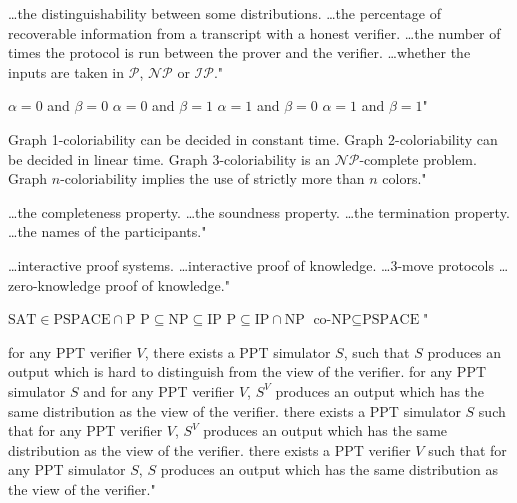{\ldots the distinguishability between some distributions.}
{\ldots the percentage of recoverable information from a transcript with a honest verifier.}
{\ldots the number of times the protocol is run between the prover and the verifier.}
{\ldots whether the inputs are taken in $\mathcal{P}$, $\mathcal{NP}$ or $\mathcal{IP}$."}

{$\alpha=0$ and $\beta=0$}
{$\alpha=0$ and $\beta=1$}
{$\alpha=1$ and $\beta=0$}
{$\alpha=1$ and $\beta=1$"}

{Graph 1-coloriability can be decided in constant time.}
{Graph 2-coloriability can be decided in linear time.}
{Graph 3-coloriability is an $\mathcal{NP}$-complete problem.}
{Graph $n$-coloriability implies the use of strictly more than $n$ colors."}

{\ldots the completeness property.}
{\ldots the soundness property.}
{\ldots the termination property.}
{\ldots the names of the participants."}

{\ldots interactive proof systems.}
{\ldots interactive proof of knowledge.}
{\ldots 3-move protocols}
{\ldots zero-knowledge proof of knowledge."}

{$\textrm{SAT} \in \textrm{PSPACE} \cap \textrm{P}$}
{$\textrm{P} \subseteq \textrm{NP} \subseteq \textrm{IP}$}
{$\textrm{P} \subseteq \textrm{IP} \cap \textrm{NP}$}
{$\textrm{co-NP} \subseteq \textrm{PSPACE}$"}

{for any PPT verifier $V$, there exists a PPT simulator $S$, such that $S$ produces an output which is hard to distinguish from the view of the verifier.}
{for any PPT simulator $S$ and for any PPT verifier $V$, $S^{V}$ produces an output which has the same distribution as the view of the verifier.}
{there exists a PPT simulator $S$ such that for any PPT verifier $V$, $S^{V}$ produces an output which has the same distribution as the view of the verifier.}
{there exists a PPT verifier $V$ such that for any PPT simulator $S$, $S$ produces an output which has the same distribution as the view of the verifier."}


